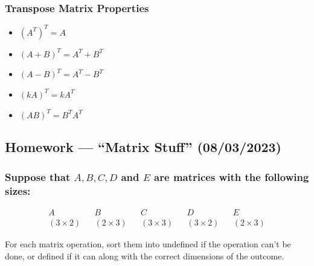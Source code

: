 \documentclass[
  letterpaper,
  DIV=11,
  numbers=noendperiod]{scrartcl}
\providecommand{\tightlist}{%
  \setlength{\itemsep}{0pt}\setlength{\parskip}{0pt}}\usepackage{longtable,booktabs,array}
\begin{document}
\hypertarget{transpose-matrix-properties}{%
\subsubsection{Transpose Matrix
Properties}\label{transpose-matrix-properties}}

\begin{itemize}
\tightlist
\item
  \((A^T)^T = A\)
\item
  \((A + B)^T = A^T + B^T\)
\item
  \((A - B)^T = A^T - B^T\)
\item
  \((kA)^T = kA^T\)
\item
  \((AB)^T = B^T A^T\)
\end{itemize}

\hypertarget{homework-matrix-stuff-08032023}{%
\subsection{Homework --- ``Matrix Stuff''
(08/03/2023)}\label{homework-matrix-stuff-08032023}}

\hypertarget{suppose-that-a-b-c-d-and-e-are-matrices-with-the-following-sizes}{%
\subsubsection{\texorpdfstring{Suppose that \(A, B, C, D\) and \(E\) are
matrices with the following
sizes:}{Suppose that A, B, C, D and E are matrices with the following sizes:}}\label{suppose-that-a-b-c-d-and-e-are-matrices-with-the-following-sizes}}

\begin{align*}
&A& &B& &C& &D& &E& \\
&(3 \times 2)& &(2 \times 3)& &(3 \times 3)& &(3 \times 2)& &(2 \times 3)&
\end{align*}

For each matrix operation, sort them into undefined if the operation
can't be done, or defined if it can along with the correct dimensions of
the outcome.
\end{document}
